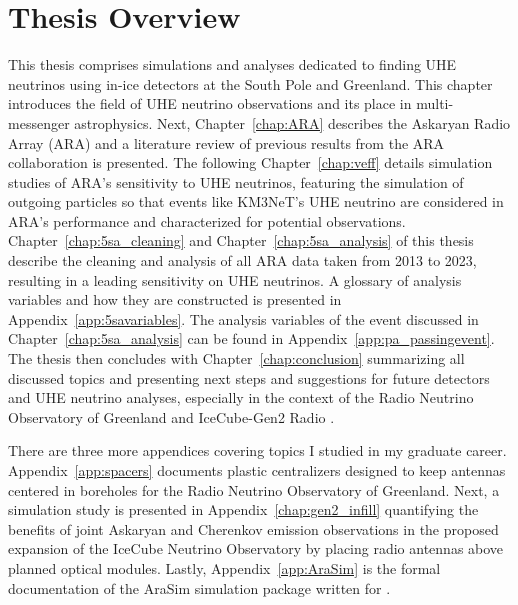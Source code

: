 \section{Thesis Overview}

  This thesis comprises simulations and analyses dedicated to finding UHE neutrinos using in-ice detectors at the South Pole and Greenland. 
  This chapter introduces the field of UHE neutrino observations and its place in multi-messenger astrophysics. 
  Next, Chapter~\ref{chap:ARA} describes the Askaryan Radio Array (ARA) and a literature review of previous results from the ARA collaboration is presented.
  The following Chapter~\ref{chap:veff} details simulation studies of ARA's sensitivity to UHE neutrinos, featuring the simulation of outgoing particles so that events like KM3NeT's UHE neutrino are considered in ARA's performance and characterized for potential observations. 
  Chapter~\ref{chap:5sa_cleaning} and Chapter~\ref{chap:5sa_analysis} of this thesis describe the cleaning and analysis of all ARA data taken from 2013 to 2023, resulting in a leading sensitivity on UHE neutrinos.
  A glossary of analysis variables and how they are constructed is presented in Appendix~\ref{app:5savariables}. 
  The analysis variables of the event discussed in Chapter~\ref{chap:5sa_analysis} can be found in Appendix~\ref{app:pa_passingevent}.
  The thesis then concludes with Chapter~\ref{chap:conclusion} summarizing all discussed topics and presenting next steps and suggestions for future detectors and UHE neutrino analyses, especially in the context of the Radio Neutrino Observatory of Greenland and IceCube-Gen2 Radio \citep{rnog_design, icecube_gen2}. 

  There are three more appendices covering topics I studied in my graduate career.
  Appendix~\ref{app:spacers} documents plastic centralizers designed to keep antennas centered in boreholes for the Radio Neutrino Observatory of Greenland. 
  Next, a simulation study is presented in Appendix~\ref{chap:gen2_infill} quantifying the benefits of joint Askaryan and Cherenkov emission observations in the proposed expansion of the IceCube Neutrino Observatory by placing radio antennas above planned optical modules. 
  Lastly, Appendix~\ref{app:AraSim} is the formal documentation of the AraSim simulation package written for \citep{ara_veff}. 